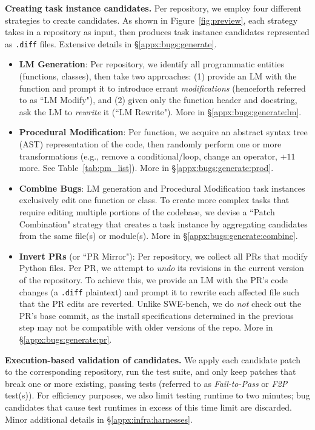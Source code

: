 \textbf{Creating task instance candidates.}
Per repository, we employ four different strategies to create candidates.
As shown in Figure~\ref{fig:preview}, each strategy takes in a repository as input, then produces task instance candidates represented as \texttt{.diff} files.
Extensive details in \S\ref{appx:bugs:generate}.
\begin{itemize}[leftmargin=15pt]
    \item \textbf{LM Generation}: Per repository, we identify all programmatic entities (functions, classes), then take two approaches: (1) provide an LM with the function and prompt it to introduce errant \textit{modifications} (henceforth referred to as ``LM Modify"), and (2) given only the function header and docstring, ask the LM to \textit{rewrite} it (``LM Rewrite").
    More in \S\ref{appx:bugs:generate:lm}.
    \item \textbf{Procedural Modification}: Per function, we acquire an abstract syntax tree (AST) representation of the code, then randomly perform one or more transformations (e.g., remove a conditional/loop, change an operator, +$11$ more. See Table~\ref{tab:pm_list}).
    More in \S\ref{appx:bugs:generate:prod}.
    \item \textbf{Combine Bugs}: LM generation and Procedural Modification task instances exclusively edit one function or class.
    To create more complex tasks that require editing multiple portions of the codebase, we devise a ``Patch Combination" strategy that creates a task instance by aggregating candidates from the same file(s) or module(s).
    More in \S\ref{appx:bugs:generate:combine}.
    \item \textbf{Invert PRs} (or ``PR Mirror"): Per repository, we collect all PRs that modify Python files.
    Per PR, we attempt to \emph{undo} its revisions in the current version of the repository.
    To achieve this, we provide an LM with the PR's code changes (a \texttt{.diff} plaintext) and prompt it to rewrite each affected file such that the PR edits are reverted.
    Unlike SWE-bench, we do \textit{not} check out the PR’s base commit, as the install specifications determined in the previous step may not be compatible with older versions of the repo.
    More in \S\ref{appx:bugs:generate:pr}.
\end{itemize}

\textbf{Execution-based validation of candidates.}
We apply each candidate patch to the corresponding repository, run the test suite, and only keep patches that break one or more existing, passing tests (referred to as \textit{Fail-to-Pass} or \textit{F2P} test(s)).
For efficiency purposes, we also limit testing runtime to two minutes; bug candidates that cause test runtimes in excess of this time limit are discarded.
Minor additional details in \S\ref{appx:infra:harnesses}.

